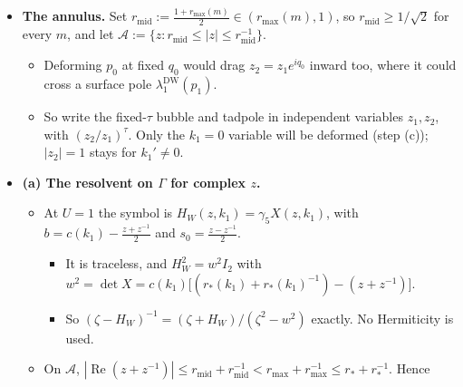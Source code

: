 \documentclass[11pt,a4paper]{article}
\begin{document}
\begin{itemize}
\begin{itemize}
\begin{itemize}
\begin{itemize}
\item{} {\bfseries\boldmath Numerical check} ($D_N$ from its $2 \times 2$ closed form): In $(0.9, 1)$ there is one zero, in the $+$ channel only. It agrees with the 5d pencil's $z_0$ to 8 digits. The residue on a circle about $z_0$ alone is $2c P_0^+$, with $|c/m - 1| = 3.6, 1.9, 1.1 \times 10^{-2}$ at $a_5 = 0.2, 0.1, 0.05$ ($m = 0.7$, $S = 8$). It is $1.75 \times 10^{-2}$ at $a_5 = 0.1$, $S = 16$, and $3.8 \times 10^{-3}$ at $m = 0.3$, $a_5 = 0.05$, $S = 32$. So the error is $O(a_5)$, uniformly in $S$.
\end{itemize}

\end{itemize}

\item{} {\bfseries\boldmath The annulus.} Set $r_{\text{mid}} := \frac{1 + r_{\max}(m)}{2} \in (r_{\max}(m), 1)$, so $r_{\text{mid}} \ge 1/\sqrt{2}$ for every $m$, and let $\mathcal{A} := \{z : r_{\text{mid}} \le |z| \le r_{\text{mid}}^{-1}\}$.
\begin{itemize}
\item{} Deforming $p_0$ at fixed $q_0$ would drag $z_2 = z_1 e^{iq_0}$ inward too, where it could cross a surface pole $\lambda_1^{\text{DW}}(p_1)$.
\item{} So write the fixed-$\tau$ bubble and tadpole in independent variables $z_1, z_2$, with $(z_2/z_1)^\tau$. Only the $k_1 = 0$ variable will be deformed (step (c)); $|z_2| = 1$ stays for $k_1' \ne 0$.
\end{itemize}

\item{} {\bfseries\boldmath (a) The resolvent on $\Gamma$ for complex $z$.}
\begin{itemize}
\item{} At $U = 1$ the symbol is $H_W(z, k_1) = \gamma_5 X(z, k_1)$, with $b = c(k_1) - \frac{z + z^{-1}}{2}$ and $s_0 = \frac{z - z^{-1}}{2}$.
\begin{itemize}
\item{} It is traceless, and $H_W^2 = w^2 I_2$ with $w^2 = \det X = c(k_1)\big[(r_*(k_1) + r_*(k_1)^{-1}) - (z + z^{-1})\big]$.
\item{} So $(\zeta - H_W)^{-1} = (\zeta + H_W)/(\zeta^2 - w^2)$ exactly. No Hermiticity is used.
\end{itemize}

\item{} On $\mathcal{A}$, $|\operatorname{Re}(z + z^{-1})| \le r_{\text{mid}} + r_{\text{mid}}^{-1} < r_{\max} + r_{\max}^{-1} \le r_* + r_*^{-1}$. Hence


\end{itemize}
\end{itemize}
\end{itemize}
\end{document}
